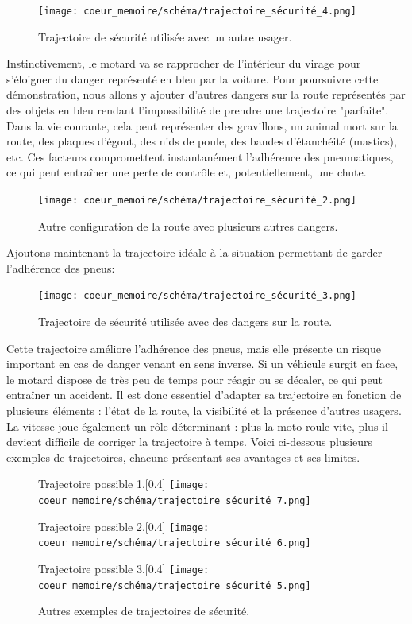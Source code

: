 \begin{figure}[H]
    \centering
    \texttt{[image: coeur\_memoire/schéma/trajectoire\_sécurité\_4.png]} 
    \caption{Trajectoire de sécurité utilisée avec un autre usager.}
\end{figure}
Instinctivement, le motard va se rapprocher de l'intérieur du virage pour s'éloigner du danger représenté en bleu par la voiture.
Pour poursuivre cette démonstration, nous allons y ajouter d'autres dangers sur la route représentés par des objets en bleu rendant l'impossibilité de prendre une trajectoire "parfaite". Dans la vie courante, cela peut représenter des gravillons, un animal mort sur la route, des plaques d'égout, des nids de poule, des bandes d'étanchéité (mastics), etc. Ces facteurs compromettent instantanément l’adhérence des pneumatiques, ce qui peut entraîner une perte de contrôle et, potentiellement, une chute.
\begin{figure}[H]
    \centering
    \texttt{[image: coeur\_memoire/schéma/trajectoire\_sécurité\_2.png]} 
    \caption{Autre configuration de la route avec plusieurs autres dangers.}
\end{figure}
Ajoutons maintenant la trajectoire idéale à la situation permettant de garder l'adhérence des pneus:
\begin{figure}[H]
    \centering
    \texttt{[image: coeur\_memoire/schéma/trajectoire\_sécurité\_3.png]} 
    \caption{Trajectoire de sécurité utilisée avec des dangers sur la route.}
    \label{fig:trajectoire_securite_difficulte}
\end{figure}
Cette trajectoire améliore l’adhérence des pneus, mais elle présente un risque important en cas de danger venant en sens inverse. Si un véhicule surgit en face, le motard dispose de très peu de temps pour réagir ou se décaler, ce qui peut entraîner un accident. Il est donc essentiel d’adapter sa trajectoire en fonction de plusieurs éléments : l’état de la route, la visibilité et la présence d’autres usagers. La vitesse joue également un rôle déterminant : plus la moto roule vite, plus il devient difficile de corriger la trajectoire à temps. Voici ci-dessous plusieurs exemples de trajectoires, chacune présentant ses avantages et ses limites.
\begin{figure}[H]
  \centering
  \begin{subcaptionbox}{Trajectoire possible 1.}[0.4\linewidth]
    {\texttt{[image: coeur\_memoire/schéma/trajectoire\_sécurité\_7.png]}}
  \end{subcaptionbox}
  \hfill
  \begin{subcaptionbox}{Trajectoire possible 2.}[0.4\linewidth]
    {\texttt{[image: coeur\_memoire/schéma/trajectoire\_sécurité\_6.png]}}
  \end{subcaptionbox}
  \vspace{0.5cm}
  
  \begin{subcaptionbox}{Trajectoire possible 3.}[0.4\linewidth]
    {\texttt{[image: coeur\_memoire/schéma/trajectoire\_sécurité\_5.png]}}
  \end{subcaptionbox}
  \caption{Autres exemples de trajectoires de sécurité.}
\end{figure}

